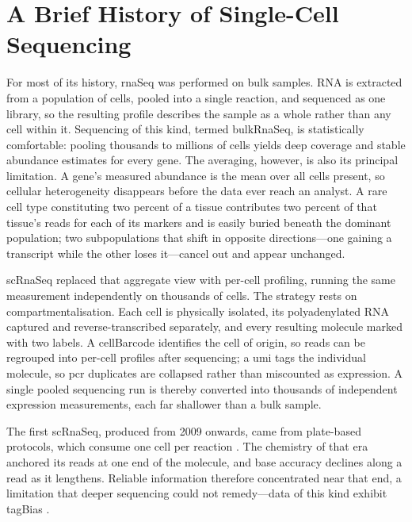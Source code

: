 \section{A Brief History of Single-Cell Sequencing}
For most of its history, \gls{rnaSeq} was performed on bulk samples. RNA is extracted from a population of cells, pooled into a single reaction, and sequenced as one library, so the resulting profile describes the sample as a whole rather than any cell within it. Sequencing of this kind, termed \gls{bulkRnaSeq}, is statistically comfortable: pooling thousands to millions of cells yields deep coverage and stable abundance estimates for every gene. The averaging, however, is also its principal limitation. A gene's measured abundance is the mean over all cells present, so cellular heterogeneity disappears before the data ever reach an analyst. A rare cell type constituting two percent of a tissue contributes two percent of that tissue's \glspl{read} for each of its markers and is easily buried beneath the dominant population; two subpopulations that shift in opposite directions---one gaining a transcript while the other loses it---cancel out and appear unchanged.

\gls{scRnaSeq} replaced that aggregate view with per-cell profiling, running the same measurement independently on thousands of cells. The strategy rests on compartmentalisation. Each cell is physically isolated, its polyadenylated RNA captured and reverse-transcribed separately, and every resulting molecule marked with two labels. A \gls{cellBarcode} identifies the cell of origin, so reads can be regrouped into per-cell profiles after sequencing; a \gls{umi} tags the individual molecule, so \gls{pcr} duplicates are collapsed rather than miscounted as expression. A single pooled sequencing run is thereby converted into thousands of independent expression measurements, each far shallower than a bulk sample.

The first \gls{scRnaSeq}, produced from 2009 onwards, came from plate-based protocols, which consume one cell per reaction \cite{tang2009mrna}. The chemistry of that era anchored its reads at one end of the molecule, and base accuracy declines along a read as it lengthens. Reliable information therefore concentrated near that end, a limitation that deeper sequencing could not remedy---data of this kind exhibit \gls{tagBias} \cite{hashimshony2012cel}.

